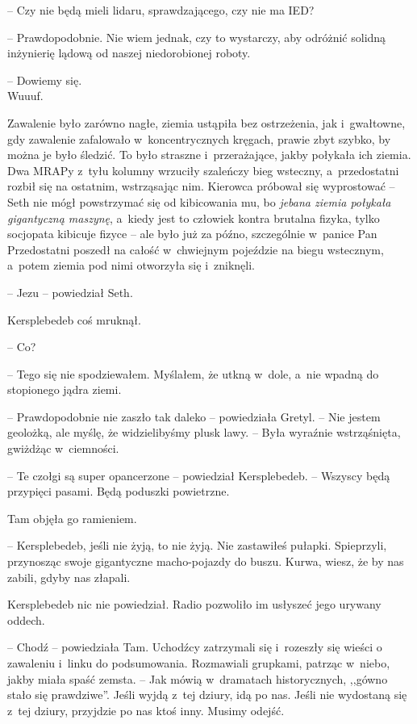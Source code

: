 \documentclass[oneside,polish,11pt,sfheadings]{mwbk}
\begin{document}
-- Czy nie będą mieli lidaru, sprawdzającego, czy nie ma IED?

-- Prawdopodobnie. Nie wiem jednak, czy to wystarczy, aby odróżnić
solidną inżynierię lądową od naszej niedorobionej roboty. 

-- Dowiemy się. \\ Wuuuf. 

Zawalenie było zarówno nagłe, ziemia ustąpiła bez ostrzeżenia,
jak i~gwałtowne, gdy zawalenie zafalowało w~koncentrycznych kręgach,
prawie zbyt szybko, by można je było śledzić. To było straszne i~przerażające, jakby połykała ich ziemia. Dwa MRAPy z~tyłu kolumny
wrzuciły szaleńczy bieg wsteczny, a~przedostatni rozbił się na ostatnim,
wstrząsając nim. Kierowca próbował się wyprostować -- Seth nie mógł
powstrzymać się od kibicowania mu, bo \textit{jebana ziemia połykała
gigantyczną maszynę}, a~kiedy jest to człowiek kontra brutalna fizyka,
tylko socjopata kibicuje fizyce -- ale było już za późno, szczególnie w~panice Pan Przedostatni poszedł na całość w~chwiejnym pojeździe na biegu
wstecznym, a~potem ziemia pod nimi otworzyła się i~zniknęli.

-- Jezu -- powiedział Seth.

Kersplebedeb coś mruknął.

-- Co?

-- Tego się nie spodziewałem. Myślałem, że utkną w~dole, a~nie wpadną do
stopionego jądra ziemi.

-- Prawdopodobnie nie zaszło tak daleko -- powiedziała Gretyl. -- Nie
jestem geolożką, ale myślę, że widzielibyśmy plusk lawy. -- Była wyraźnie
wstrząśnięta, gwiżdżąc w~ciemności.

-- Te czołgi są super opancerzone -- powiedział Kersplebedeb. -- Wszyscy
będą przypięci pasami. Będą poduszki powietrzne.

Tam objęła go ramieniem. 

-- Kersplebedeb, jeśli nie żyją, to nie żyją.
Nie zastawiłeś pułapki. Spieprzyli, przynosząc swoje gigantyczne
macho-pojazdy do buszu. Kurwa, wiesz, że by nas zabili, gdyby nas
złapali.

Kersplebedeb nic nie powiedział. Radio pozwoliło im usłyszeć jego
urywany oddech.

-- Chodź -- powiedziała Tam. Uchodźcy zatrzymali się i~rozeszły się wieści
o zawaleniu i~linku do podsumowania. Rozmawiali grupkami, patrząc w~niebo, jakby miała spaść zemsta. -- Jak mówią w~dramatach historycznych,
,,gówno stało się prawdziwe''. Jeśli wyjdą z~tej dziury, idą po nas.
Jeśli nie wydostaną się z~tej dziury, przyjdzie po nas ktoś inny. Musimy
odejść.
\end{document}
